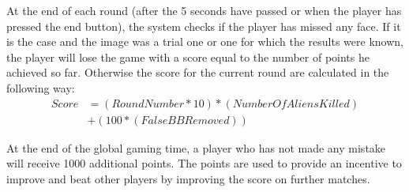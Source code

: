 At the end of each round (after the 5 seconds have passed or when the player has
pressed the end button), the system checks if the player has missed any face. If
it is the case and the image was a trial one or one for which the results were
known, the player will lose the game with a score equal to the number of points
he achieved so far. Otherwise the score for the current round are calculated in
the following way:
\begin{equation}
\begin{split}
    Score &= (RoundNumber*10)*(NumberOfAliensKilled)\\
          &+(100*(FalseBBRemoved))
\end{split}
\end{equation}

At the end of the global gaming time, a player who has not made any mistake will
receive 1000 additional points. The points are used to provide an incentive to
improve and beat other players by improving the score on further matches.